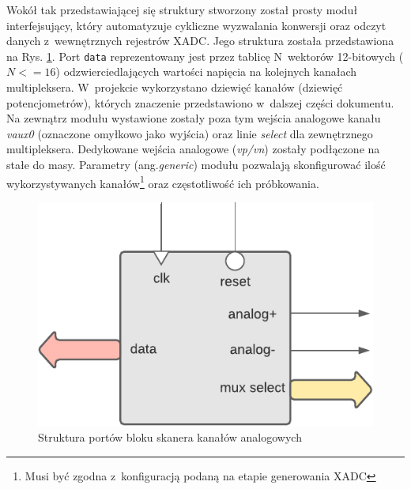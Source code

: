 Wokół tak przedstawiającej się struktury stworzony został prosty moduł interfejsujący, który automatyzuje cykliczne wyzwalania konwersji oraz odczyt danych z~wewnętrznych rejestrów XADC. Jego struktura została przedstawiona na Rys. \ref{analog-scanner-structure}. Port \verb|data| reprezentowany jest przez tablicę N~wektorów 12-bitowych ($N <= 16$) odzwierciedlających wartości napięcia na kolejnych kanałach multipleksera. W~projekcie wykorzystano dziewięć kanałów (dziewięć potencjometrów), których znaczenie przedstawiono w~dalszej części dokumentu. Na zewnątrz modułu wystawione zostały poza tym wejścia analogowe kanału \textit{vaux0} (oznaczone omyłkowo jako wyjścia) oraz linie \textit{select} dla zewnętrznego multipleksera. Dedykowane wejścia analogowe (\textit{vp/vn}) zostały podłączone na stałe do masy. Parametry (ang.\textit{generic}) modułu pozwalają skonfigurować ilość wykorzystywanych kanałów\footnote{Musi być zgodna z~konfiguracją podaną na etapie generowania XADC} oraz częstotliwość ich próbkowania.
 
\vspace{0.5cm}
\begin{figure}[ht]
    \centering
    \includegraphics[scale=1.0]{img/diagrams/analog_scanner.pdf}
    \captionsetup{format=plain,justification=centering}
    \caption{Struktura portów bloku skanera kanałów analogowych}
    \label{analog-scanner-structure}
\end{figure}
\vspace{0.5cm}

